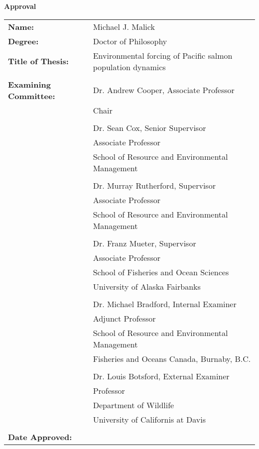 


\begin{center}
{ \large \textbf{Approval} }
\end{center}

\vspace{4mm}

\hspace*{-1cm} \begin{tabular}{ l p{94mm} }
  \textbf{Name:} & Michael J. Malick \\
  \textbf{Degree:} & Doctor of Philosophy \\
  \textbf{Title of Thesis:} & Environmental forcing of Pacific salmon population
    dynamics \\

  & \\

  \textbf{Examining Committee:} & Dr. Andrew Cooper, Associate Professor \\
                                & Chair \\

    & \\ \cline{2-2}
    & Dr. Sean Cox, Senior Supervisor \\
    & Associate Professor \\
    & School of Resource and Environmental Management \\

    & \\ \cline{2-2}
    & Dr. Murray Rutherford, Supervisor \\
    & Associate Professor \\
    & School of Resource and Environmental Management \\

    & \\ \cline{2-2}
    & Dr. Franz Mueter, Supervisor \\
    & Associate Professor \\
    & School of Fisheries and Ocean Sciences\\
    & University of Alaska Fairbanks\\

    & \\ \cline{2-2}
    & Dr. Michael Bradford, Internal Examiner \\
    & Adjunct Professor \\
    & School of Resource and Environmental Management \\
    & Fisheries and Oceans Canada, Burnaby, B.C. \\

    & \\ \cline{2-2}
    & Dr. Louis Botsford, External Examiner \\
    & Professor \\
    & Department of Wildlife \\
    & University of Californis at Davis \\
    
    & \\
  \textbf{Date Approved:}  & \\  \cline{2-2}
\end{tabular}


